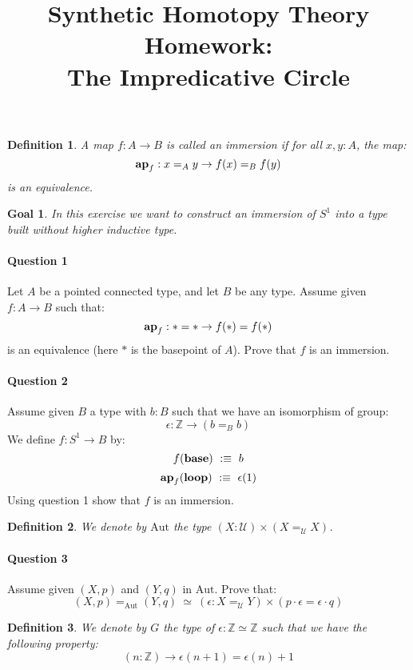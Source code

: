 \documentclass{article}[6pt]%
\title{Synthetic Homotopy Theory Homework: \\ The Impredicative Circle}
\date{}
\newtheorem{definition}{Definition}
\newtheorem{goal}{Goal}
\begin{document}
\maketitle

\begin{definition} 
A map $f : A\rightarrow B$ is called an immersion if for all $x,y:A$, the map:
\[\mathrm{\bf ap}_f : x =_A y \rightarrow f(x) =_B f(y)\]
is an equivalence.
\end{definition}

\begin{goal} 
In this exercise we want to construct an immersion of $S^1$ into a type built without higher inductive type.
\end{goal}

\paragraph{Question 1} 
Let $A$ be a pointed connected type, and let $B$ be any type. Assume given $f:A\rightarrow B$ such that: 
\[\mathrm{\bf ap}_f : * = * \rightarrow f(*) = f(*)\]
is an equivalence (here $*$ is the basepoint of $A$). Prove that $f$ is an immersion.

\paragraph{Question 2} 
Assume given $B$ a type with $b:B$ such that we have an isomorphism of group:
\[\epsilon :  \mathbb{Z} \rightarrow (b=_Bb)\] 
We define $f : S^1 \rightarrow B$ by: 
\[f(\mathrm{\bf base})\ :\equiv\ b\]
\[\mathrm{\bf ap}_f(\mathrm{\bf loop})\ :\equiv\ \epsilon(1)\]
Using question 1 show that $f$ is an immersion.

\begin{definition} 
We denote by $\mathrm{Aut}$ the type $(X:{\mathcal U}) \times (X =_{\mathcal U} X)$.
\end{definition}

\paragraph{Question 3} 
Assume given $(X,p)$ and $(Y,q)$ in $\mathrm{Aut}$. Prove that:
\[(X,p) =_{\mathrm{Aut}} (Y,q) \ \simeq\ (\epsilon : X=_{\mathcal U}Y) \times (p\cdot\epsilon = \epsilon\cdot q)\]

\begin{definition}
We denote by $G$ the type of $\epsilon : \mathbb{Z}\simeq \mathbb{Z}$ such that we have the following property:
\[(n:\mathbb{Z}) \rightarrow \epsilon(n+1) = \epsilon(n)+1\]
\end{definition}
\end{document}
